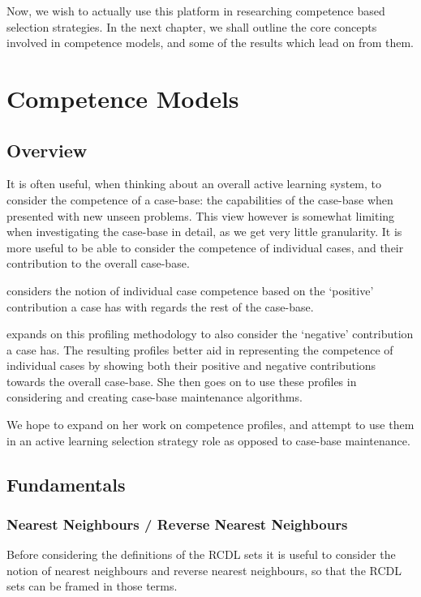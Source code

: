 \documentclass[a4paper,11pt]{report}
\begin{document}
Now, we wish to actually use this platform in researching competence based selection strategies. In the next chapter, we shall outline the core concepts involved in competence models, and some of the results which lead on from them.

\chapter{Competence Models\label{cha:CompetenceModels}}
\section{Overview}
It is often useful, when thinking about an overall active learning system, to consider the competence of a case-base: the capabilities of the case-base when presented with new unseen problems. This view however is somewhat limiting when investigating the case-base in detail, as we get very little granularity. It is more useful to be able to consider the competence of individual cases, and their contribution to the overall case-base.

\citet{Smyth1995} considers the notion of individual case competence based on the `positive' contribution a case has with regards the rest of the case-base.

\citet{Delany2009} expands on this profiling methodology to also consider the `negative' contribution a case has. The resulting profiles better aid in representing the competence of individual cases by showing both their positive and negative contributions towards the overall case-base. She then goes on to use these profiles in considering and creating case-base maintenance algorithms. 

We hope to expand on her work on competence profiles, and attempt to use them in an active learning selection strategy role as opposed to case-base maintenance.

\section{Fundamentals}
\subsection{Nearest Neighbours / Reverse Nearest Neighbours}
Before considering the definitions of the RCDL sets it is useful to consider the notion of nearest neighbours and reverse nearest neighbours, so that the RCDL sets can be framed in those terms.
\end{document}
